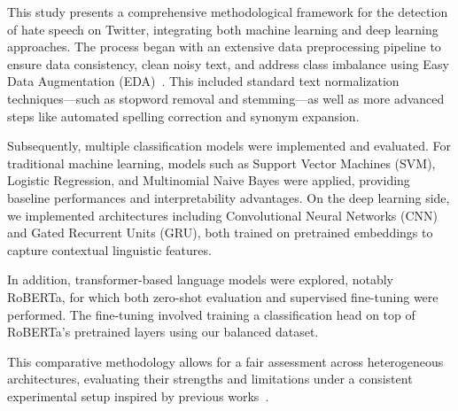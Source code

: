 This study presents a comprehensive methodological framework for the detection of hate speech on Twitter, integrating both machine learning and deep learning approaches. The process began with an extensive data preprocessing pipeline to ensure data consistency, clean noisy text, and address class imbalance using Easy Data Augmentation (EDA)~\cite{wei2019eda}. This included standard text normalization techniques—such as stopword removal and stemming—as well as more advanced steps like automated spelling correction and synonym expansion.

Subsequently, multiple classification models were implemented and evaluated. For traditional machine learning, models such as Support Vector Machines (SVM), Logistic Regression, and Multinomial Naive Bayes were applied, providing baseline performances and interpretability advantages. On the deep learning side, we implemented architectures including Convolutional Neural Networks (CNN) and Gated Recurrent Units (GRU), both trained on pretrained embeddings to capture contextual linguistic features.

In addition, transformer-based language models were explored, notably RoBERTa, for which both zero-shot evaluation and supervised fine-tuning were performed. The fine-tuning involved training a classification head on top of RoBERTa’s pretrained layers using our balanced dataset.

This comparative methodology allows for a fair assessment across heterogeneous architectures, evaluating their strengths and limitations under a consistent experimental setup inspired by previous works~\cite{fieri2023offensive,almeida2023comparison}.
